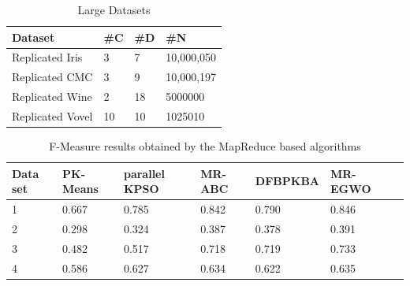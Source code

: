 \documentclass[review]{elsarticle}
\begin{document}
\begin{table}
\caption{Large Datasets}
\scriptsize
\begin{center}
\renewcommand{\arraystretch}{0.7}
  \begin{tabular}{l l l l }

    \hline
\textbf{Dataset} & \textbf{\#C} & \textbf{\#D} 		&		\textbf{\#N}    \\
\hline
 Replicated Iris	&	3	&	7	&	10,000,050	\\
Replicated CMC	&	3	&	9	&	10,000,197	\\
Replicated Wine	&	2	&	18	&	5000000	\\
Replicated Vovel &	10	& 10	&	1025010	\\

    \hline
  \end{tabular}
\end{center}
\label{tab:large dataset}
\end{table}


\begin{table}
\caption{F-Measure results obtained by the MapReduce based algorithms}
\scriptsize
\begin{center}
\renewcommand{\arraystretch}{0.7}
  \begin{tabular}{l l l l l l l}
    \hline
    \hline
\textbf{Data set} & \textbf{PK-Means} &\textbf{parallel KPSO} &\textbf{MR-ABC} &\textbf{DFBPKBA} &\textbf{MR-EGWO}\\
\hline

1	&	0.667	&	0.785	&	0.842	&	0.790  &  0.846	\\
2	&	0.298	&	0.324	&	0.387	&	0.378  &  0.391	\\
3	&	0.482	&	0.517	&	0.718	&	0.719  &  0.733	\\
4	&	0.586	&	0.627	&	0.634	&	0.622  &  0.635	\\

    \hline
  \end{tabular}
\end{center}
\label{tab:FM}
\end{table}
\end{document}
